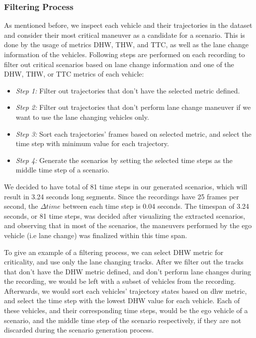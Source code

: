 \documentclass[conference]{IEEEtran}
\begin{document}
\subsubsection{Filtering Process}
\label{subsubsection:filtering process}
As mentioned before, we inspect each vehicle and their trajectories in the dataset and consider their most critical maneuver as a candidate for a scenario. This is done by the usage of metrics DHW, THW, and TTC, as well as the lane change information of the vehicles. Following steps are performed on each recording to filter out critical scenarios based on lane change information and one of the DHW, THW, or TTC metrics of each vehicle:

\begin{itemize}
	\item \textit{Step 1:} Filter out trajectories that don't have the selected metric defined.
	\item \textit{Step 2:} Filter out trajectories that don't perform lane change maneuver if we want to use the lane changing vehicles only.
	\item \textit{Step 3:} Sort each trajectories' frames based on selected metric, and select the time step with minimum value for each trajectory.
	\item \textit{Step 4:} Generate the scenarios by setting the selected time steps as the middle time step of a scenario.
\end{itemize}

We decided to have total of 81 time steps in our generated scenarios, which will result in 3.24 seconds long segments. Since the recordings have 25 frames per second, the $\Delta time$ between each time step is 0.04 seconds. The timespan of 3.24 seconds, or 81 time steps, was decided after visualizing the extracted scenarios, and observing that in most of the scenarios, the maneuvers performed by the ego vehicle (i.e lane change) was finalized within this time span. 

To give an example of a filtering process, we can select DHW metric for criticality, and use only the lane changing tracks. After we filter out the tracks that don't have the DHW metric defined, and don't perform lane changes during the recording, we would be left with a subset of vehicles from the recording. Afterwards, we would sort each vehicles' trajectory states based on dhw metric, and select the time step with the lowest DHW value for each vehicle. Each of these vehicles, and their corresponding time steps, would be the ego vehicle of a scenario, and the middle time step of the scenario respectively, if they are not discarded during the scenario generation process.
\end{document}

